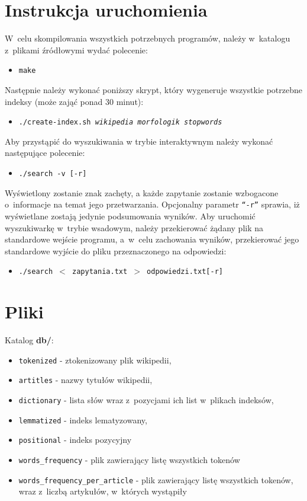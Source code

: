 \documentclass[a4paper,12pt]{article}
\begin{document}
\newpage

\section{Instrukcja uruchomienia}

W~celu skompilowania wszystkich potrzebnych programów, należy w~katalogu
z~plikami źródłowymi wydać polecenie:
\begin{itemize}
	\item \texttt{make}
\end{itemize}

Następnie należy wykonać poniższy skrypt, który wygeneruje wszystkie potrzebne
indeksy (może zająć ponad 30 minut):
\begin{itemize}
	\item \texttt{./create-index.sh \textit{wikipedia morfologik stopwords}}
\end{itemize}

Aby przystąpić do wyszukiwania w trybie interaktywnym należy wykonać następujące
polecenie:
\begin{itemize}
	\item \texttt{./search -v [-r]}
\end{itemize}
Wyświetlony zostanie znak zachęty, a każde zapytanie zostanie wzbogacone
o~informacje na temat jego przetwarzania. Opcjonalny parametr \texttt{``-r''}
sprawia, iż wyświetlane zostają jedynie podsumowania wyników.
\linebreak
\linebreak
Aby uruchomić wyszukiwarkę w~trybie wsadowym, należy przekierować żądany plik
na standardowe wejście programu, a~w~celu zachowania wyników, przekierować jego
standardowe wyjście do pliku przeznaczonego na odpowiedzi:
\begin{itemize}
	\item \texttt{./search $<$ zapytania.txt $>$ odpowiedzi.txt[-r]}
\end{itemize}

\newpage

\section{Pliki}

Katalog \textbf{db/}:
\begin{itemize}
	\item \texttt{tokenized} - ztokenizowany plik wikipedii,
	\item \texttt{artitles} - nazwy tytułów wikipedii,
	\item \texttt{dictionary} - lista słów wraz z~pozycjami ich list w~plikach
		indeksów,
	\item \texttt{lemmatized} - indeks lematyzowany,
	\item \texttt{positional} - indeks pozycyjny
	\item \texttt{words\_frequency} - plik zawierający listę wszystkich tokenów
	\item \texttt{words\_frequency\_per\_article} - plik zawierający listę
		wszystkich tokenów, wraz z~liczbą artykułów, w~których wystąpiły
\end{itemize}
\end{document}
